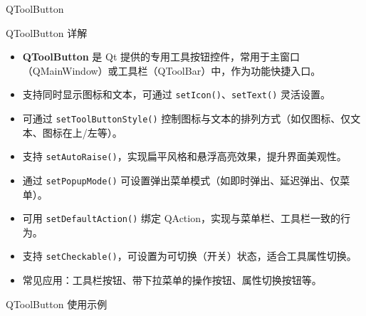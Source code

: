 \documentclass[UTF8,aspectratio=169]{beamer}
\begin{document}
\begin{frame}{QToolButton}
    \begin{ytublock}{QToolButton 详解}
        \begin{itemize}
            \item \textbf{QToolButton} 是 Qt 提供的专用工具按钮控件，常用于主窗口（QMainWindow）或工具栏（QToolBar）中，作为功能快捷入口。
            \item 支持同时显示图标和文本，可通过 \texttt{setIcon()}、\texttt{setText()} 灵活设置。
            \item 可通过 \texttt{setToolButtonStyle()} 控制图标与文本的排列方式（如仅图标、仅文本、图标在上/左等）。
            \item 支持 \texttt{setAutoRaise()}，实现扁平风格和悬浮高亮效果，提升界面美观性。
            \item 通过 \texttt{setPopupMode()} 可设置弹出菜单模式（如即时弹出、延迟弹出、仅菜单）。
            \item 可用 \texttt{setDefaultAction()} 绑定 QAction，实现与菜单栏、工具栏一致的行为。
            \item 支持 \texttt{setCheckable()}，可设置为可切换（开关）状态，适合工具属性切换。
            \item 常见应用：工具栏按钮、带下拉菜单的操作按钮、属性切换按钮等。
        \end{itemize}
    \end{ytublock}
\end{frame}

\begin{frame}[fragile]{QToolButton 使用示例}
    \begin{columns}
        \begin{column}{0.48\textwidth}
            \inputminted[firstline=1,lastline=19]{cpp}{code/qt_toolbutton_example.cpp}
        \end{column}
        \begin{column}{0.48\textwidth}
            \inputminted[firstline=20,lastline=39]{cpp}{code/qt_toolbutton_example.cpp}
        \end{column}
    \end{columns}
\end{frame}
\end{document}

